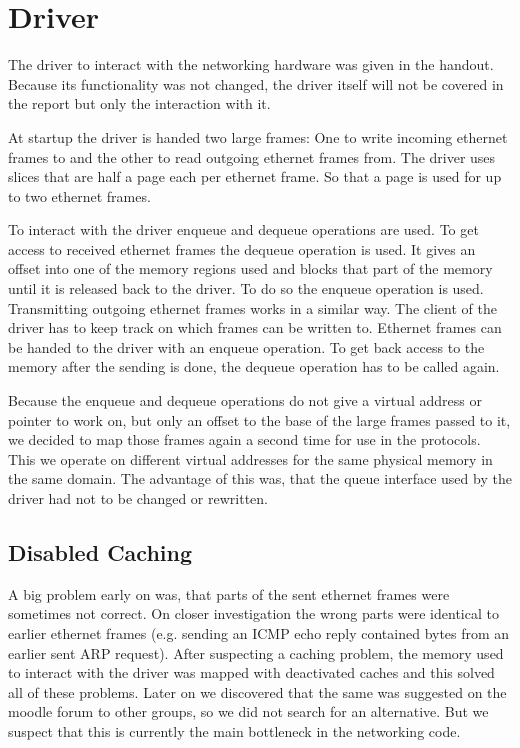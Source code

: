 \section{Driver}

The driver to interact with the networking hardware was given in the handout. Because its functionality was not changed, the driver itself will not be covered in the report but only the interaction with it.

At startup the driver is handed two large frames: One to write incoming ethernet frames to and the other to read outgoing ethernet frames from. The driver uses slices that are half a page each per ethernet frame. So that a page is used for up to two ethernet frames.

To interact with the driver enqueue and dequeue operations are used. To get access to received ethernet frames the dequeue operation is used. It gives an offset into one of the memory regions used and blocks that part of the memory until it is released back to the driver. To do so the enqueue operation is used. Transmitting outgoing ethernet frames works in a similar way. The client of the driver has to keep track on which frames can be written to. Ethernet frames can be handed to the driver with an enqueue operation. To get back access to the memory after the sending is done, the dequeue operation has to be called again.

Because the enqueue and dequeue operations do not give a virtual address or pointer to work on, but only an offset to the base of the large frames passed to it, we decided to map those frames again a second time for use in the protocols. This we operate on different virtual addresses for the same physical memory in the same domain. The advantage of this was, that the queue interface used by the driver had not to be changed or rewritten.

\subsection{Disabled Caching}
A big problem early on was, that parts of the sent ethernet frames were sometimes not correct. On closer investigation the wrong parts were identical to earlier ethernet frames (e.g. sending an ICMP echo reply contained bytes from an earlier sent ARP request). After suspecting a caching problem, the memory used to interact with the driver was mapped with deactivated caches and this solved all of these problems. Later on we discovered that the same was suggested on the moodle forum to other groups, so we did not search for an alternative. But we suspect that this is currently the main bottleneck in the networking code.

